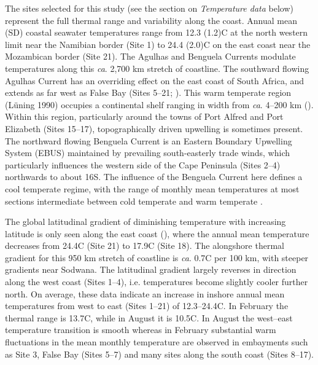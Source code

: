 \documentclass[a4paper,10pt,review]{elsarticle}
\begin{document}
The sites selected for this study (see the section on \emph{Temperature data} below) represent the full thermal range and variability along the coast. Annual mean (SD) coastal seawater temperatures range from 12.3 (1.2)\degree C at the north western limit near the Namibian border (Site 1) to 24.4 (2.0)\degree C on the east coast near the Mozambican border (Site 21). The Agulhas and Benguela Currents modulate temperatures along this \emph{ca}. 2,700 km stretch of coastline. The southward flowing Agulhas Current has an overriding effect on the east coast of South Africa, and extends as far west as False Bay (Sites 5--21; ). This warm temperate region (Lüning 1990) occupies a continental shelf ranging in width from \emph{ca}. 4--200 km (). Within this region, particularly around the towns of Port Alfred and Port Elizabeth (Sites 15--17), topographically driven upwelling is sometimes present. The northward flowing Benguela Current is an Eastern Boundary Upwelling System (EBUS) maintained by prevailing south-easterly trade winds, which particularly influences the western side of the Cape Peninsula (Sites 2--4) northwards to about 16\degree S. The influence of the Benguela Current here defines a cool temperate regime, with the range of monthly mean temperatures at most sections intermediate between cold temperate and warm temperate \cite{Luning1990}.

The global latitudinal gradient of diminishing temperature with increasing latitude is only seen along the east coast (), where the annual mean temperature decreases from 24.4\degree C (Site 21) to 17.9\degree C (Site 18). The alongshore thermal gradient for this 950 km stretch of coastline is \emph{ca}. 0.7\degree C per 100 km, with steeper gradients near Sodwana. The latitudinal gradient largely reverses in direction along the west coast (Sites 1--4), i.e. temperatures become slightly cooler further north. On average, these data indicate an increase in inshore annual mean temperatures from west to east (Sites 1--21) of 12.3--24.4\degree C. In February the thermal range is 13.7\degree C, while in August it is 10.5\degree C. In August the west–east temperature transition is smooth whereas in February substantial warm fluctuations in the mean monthly temperature are observed in embayments such as Site 3, False Bay (Sites 5--7) and many sites along the south coast (Sites 8--17).
\end{document}
